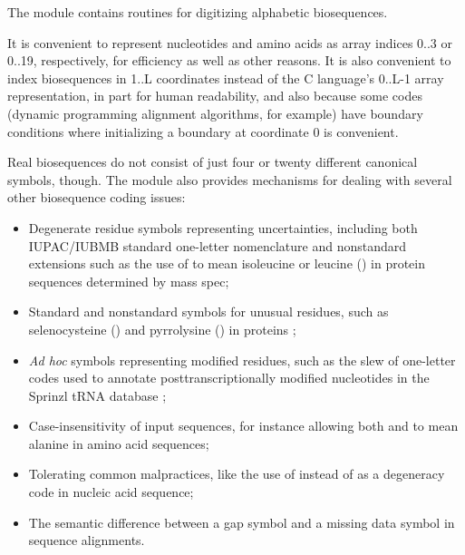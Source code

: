 The  module contains routines for digitizing
alphabetic biosequences.



It is convenient to represent nucleotides and amino acids as array
indices 0..3 or 0..19, respectively, for efficiency as well as other
reasons. It is also convenient to index biosequences in 1..L
coordinates instead of the C language's 0..L-1 array representation,
in part for human readability, and also because some codes (dynamic
programming alignment algorithms, for example) have boundary
conditions where initializing a boundary at coordinate 0 is
convenient.

Real biosequences do not consist of just four or twenty different
canonical symbols, though. The  module also provides
mechanisms for dealing with several other biosequence coding issues:

\begin{itemize}
  \item Degenerate residue symbols representing uncertainties,
        including both IUPAC/IUBMB standard one-letter nomenclature
        and nonstandard extensions such as the use of  to
        mean isoleucine or leucine () in protein sequences
        determined by mass spec;

  \item Standard and nonstandard symbols for unusual residues, such as
        selenocysteine () and pyrrolysine () in
        proteins ;

  \item \emph{Ad hoc} symbols representing modified residues, such as
        the slew of one-letter codes used to annotate
        posttranscriptionally modified nucleotides in the Sprinzl tRNA
        database \citep{Sprinzl98};

  \item Case-insensitivity of input sequences, for instance allowing
        both  and  to mean alanine in amino acid
        sequences;

  \item Tolerating common malpractices, like the use of 
       instead of  as a degeneracy code in nucleic acid
       sequence;

  \item The semantic difference between a gap symbol and a missing
        data symbol in sequence alignments.
\end{itemize}        

